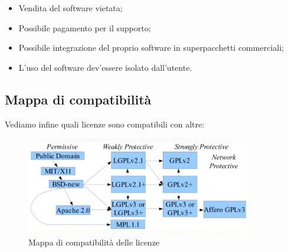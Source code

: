 \begin{itemize}

\item Vendita del software vietata;
\item Possibile pagamento per il supporto;
\item Possibile integrazione del proprio software in superpacchetti commerciali;
\item L'uso del software dev'essere isolato dall'utente.

\end{itemize}

\subsection{Mappa di compatibilità}

Vediamo infine quali licenze sono compatibili con altre:

\begin{figure}[htpd]
\centering
\includegraphics[width=100mm]{images/license-compatibility.png}
\caption{Mappa di compatibilità delle licenze}
\end{figure}